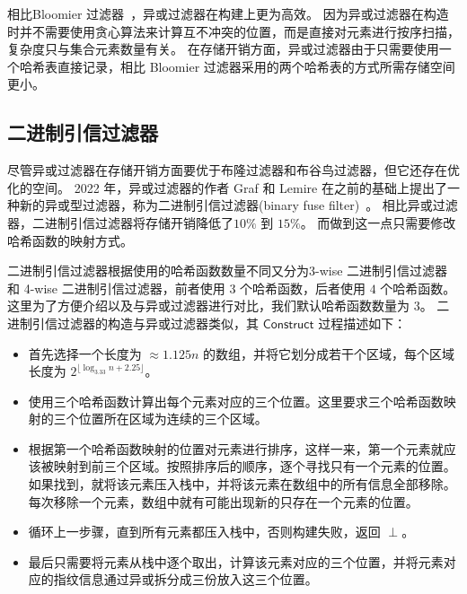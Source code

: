 相比Bloomier 过滤器~\cite{chazelle2004bloomier}，异或过滤器在构建上更为高效。
因为异或过滤器在构造时并不需要使用贪心算法来计算互不冲突的位置，而是直接对元素进行按序扫描，复杂度只与集合元素数量有关。
在存储开销方面，异或过滤器由于只需要使用一个哈希表直接记录，相比 Bloomier 过滤器采用的两个哈希表的方式所需存储空间更小。

\subsection{二进制引信过滤器}

尽管异或过滤器在存储开销方面要优于布隆过滤器和布谷鸟过滤器，但它还存在优化的空间。
2022 年，异或过滤器的作者 Graf 和 Lemire 在之前的基础上提出了一种新的异或型过滤器，称为二进制引信过滤器(binary fuse filter)~\cite{graf2022binary}。
相比异或过滤器，二进制引信过滤器将存储开销降低了$10\%$ 到 $15\%$。
而做到这一点只需要修改哈希函数的映射方式。

二进制引信过滤器根据使用的哈希函数数量不同又分为3-wise 二进制引信过滤器和 4-wise 二进制引信过滤器，前者使用 3 个哈希函数，后者使用 $4$ 个哈希函数。
这里为了方便介绍以及与异或过滤器进行对比，我们默认哈希函数数量为 $3$。
二进制引信过滤器的构造与异或过滤器类似，其 $\mathsf{Construct}$ 过程描述如下：
\begin{itemize}
  \item 首先选择一个长度为 $\approx 1.125 n$ 的数组，并将它划分成若干个区域，每个区域长度为 $2^{\lfloor \log_{3.33}n + 2.25\rfloor}$。
  \item 使用三个哈希函数计算出每个元素对应的三个位置。这里要求三个哈希函数映射的三个位置所在区域为连续的三个区域。
  \item 根据第一个哈希函数映射的位置对元素进行排序，这样一来，第一个元素就应该被映射到前三个区域。按照排序后的顺序，逐个寻找只有一个元素的位置。如果找到，就将该元素压入栈中，并将该元素在数组中的所有信息全部移除。每次移除一个元素，数组中就有可能出现新的只存在一个元素的位置。
  \item 循环上一步骤，直到所有元素都压入栈中，否则构建失败，返回 $\perp$。
  \item 最后只需要将元素从栈中逐个取出，计算该元素对应的三个位置，并将元素对应的指纹信息通过异或拆分成三份放入这三个位置。
\end{itemize}


